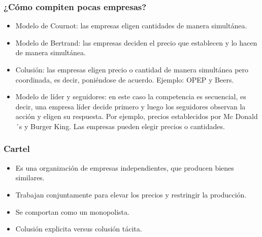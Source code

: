 \documentclass{beamer}
\begin{document}
\begin{frame}
\frametitle{¿Cómo compiten pocas empresas?}
\begin{itemize}
    \item Modelo de Cournot: las empresas eligen cantidades de manera simultánea. \vspace{2mm}
    \item Modelo de Bertrand: las empresas deciden el precio que establecen y lo hacen de manera simultánea.  \vspace{2mm}
    \item Colusión: las empresas eligen precio o cantidad de manera simultánea pero coordinada, es decir, poniéndose de acuerdo. Ejemplo: OPEP y Beers.
    \item Modelo de líder y seguidores: en este caso la competencia es secuencial, es decir, una empresa líder decide primero y luego los seguidores observan la acción y eligen su respuesta. Por ejemplo, precios establecidos por Mc Donald´s y Burger King. Las empresas pueden elegir precios o cantidades.
\end{itemize}
\end{frame}



\begin{frame}
\frametitle{Cartel}
\begin{itemize}
    \item Es una organización de empresas independientes, que producen bienes similares.\vspace{4mm}
    \item Trabajan conjuntamente para elevar los precios y restringir la producción.\vspace{4mm}
    \item Se comportan como un monopolista.\vspace{4mm}
    \item Colusión explicita versus colusión tácita.\vspace{4mm}
    \end{itemize}
\end{frame}
\end{document}
